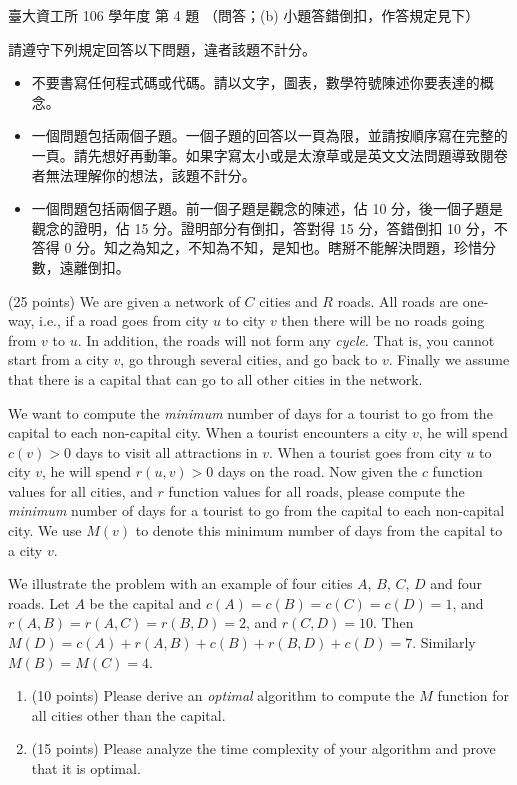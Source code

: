 \begin{pastexam}[label={px:ntu-106-dsa-04}]{臺大資工所 106 學年度 第 4 題}
（問答；(b) 小題答錯倒扣，作答規定見下）

請遵守下列規定回答以下問題，違者該題不計分。
\begin{itemize}
\item 不要書寫任何程式碼或代碼。請以文字，圖表，數學符號陳述你要表達的概念。
\item 一個問題包括兩個子題。一個子題的回答以一頁為限，並請按順序寫在完整的一頁。請先想好再動筆。如果字寫太小或是太潦草或是英文文法問題導致閱卷者無法理解你的想法，該題不計分。
\item 一個問題包括兩個子題。前一個子題是觀念的陳述，佔 10 分，後一個子題是觀念的證明，佔 15 分。證明部分有倒扣，答對得 15 分，答錯倒扣 10 分，不答得 0 分。知之為知之，不知為不知，是知也。瞎掰不能解決問題，珍惜分數，遠離倒扣。
\end{itemize}

(25 points) We are given a network of $C$ cities and $R$ roads. All roads are one-way, i.e., if a
road goes from city $u$ to city $v$ then there will be no roads going from $v$ to $u$. In
addition, the roads will not form any \textit{cycle}. That is, you cannot start from a city $v$,
go through several cities, and go back to $v$. Finally we assume that there is a capital that can
go to all other cities in the network.

We want to compute the \textit{minimum} number of days for a tourist to go from the capital to
each non-capital city. When a tourist encounters a city $v$, he will spend $c(v)>0$ days to visit
all attractions in $v$. When a tourist goes from city $u$ to city $v$, he will spend $r(u,v)>0$
days on the road. Now given the $c$ function values for all cities, and $r$ function values for
all roads, please compute the \textit{minimum} number of days for a tourist to go from the
capital to each non-capital city. We use $M(v)$ to denote this minimum number of days from the
capital to a city $v$.

We illustrate the problem with an example of four cities $A$, $B$, $C$, $D$ and four roads. Let
$A$ be the capital and $c(A)=c(B)=c(C)=c(D)=1$, and $r(A,B)=r(A,C)=r(B,D)=2$, and $r(C,D)=10$.
Then $M(D)=c(A)+r(A,B)+c(B)+r(B,D)+c(D)=7$. Similarly $M(B)=M(C)=4$.
\begin{enumerate}[label=(\alph*)]
\item (10 points) Please derive an \textit{optimal} algorithm to compute the $M$ function for
all cities other than the capital.
\item (15 points) Please analyze the time complexity of your algorithm and prove that it is
optimal.
\end{enumerate}
\end{pastexam}

